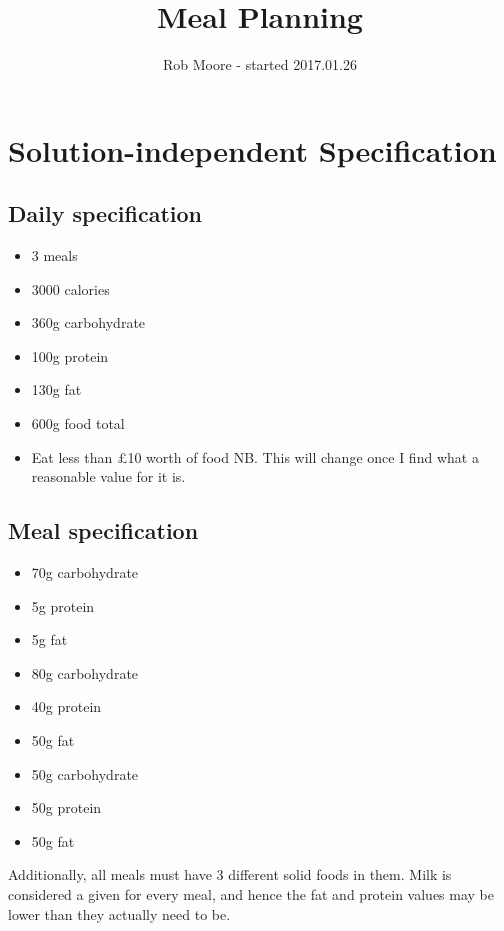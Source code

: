 \documentclass[a4paper]{article}
\title{Meal Planning}
\author{Rob Moore - started 2017.01.26}
\begin{document}
\maketitle

\section{Solution-independent Specification}

\subsection{Daily specification}

\begin{itemize}
  \item 3 meals
  \item 3000 calories
  \item 360g carbohydrate
  \item 100g protein
  \item 130g fat
  \item 600g food total
  \item Eat less than £10 worth of food NB. This will change once I find what a reasonable value for it is.
\end{itemize}

\subsection{Meal specification}

\begin{itemize}
  \item 70g carbohydrate
  \item 5g protein
  \item 5g fat
\end{itemize}

\begin{itemize}
  \item 80g carbohydrate
  \item 40g protein
  \item 50g fat
\end{itemize}

\begin{itemize}
  \item 50g carbohydrate
  \item 50g protein
  \item 50g fat
\end{itemize}

Additionally, all meals must have 3 different solid foods in them. Milk 
is considered a given for every meal, and hence the fat and protein 
values may be lower than they actually need to be.
\end{document}
